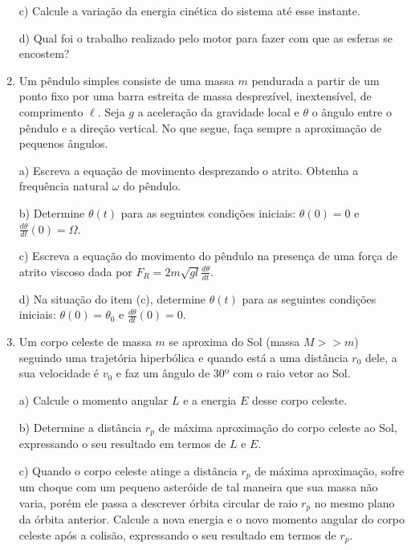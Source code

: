 \begin{enumerate}[start=1,label={\bfseries Q\arabic*.}]
c) Calcule a variação da energia cinética do sistema até esse instante.

\resposta

d) Qual foi o trabalho realizado pelo motor para fazer com que as esferas se encostem?

\resposta


\item Um pêndulo simples consiste de uma massa $m$ pendurada a partir de um ponto fixo por uma barra estreita de massa desprezível, inextensível, de comprimento $\ell$. Seja $g$ a aceleração da gravidade local e $\theta$ o ângulo entre o pêndulo e a direção vertical. No que segue, faça sempre a aproximação de pequenos ângulos.

a) Escreva a equação de movimento desprezando o atrito. Obtenha a frequência natural $\omega$ do pêndulo.

\resposta 



b) Determine $\theta(t)$ para as seguintes condições iniciais: $\theta(0)=0$ e $\frac{d \theta}{d t}(0)=\Omega$.

\resposta

c) Escreva a equação do movimento do pêndulo na presença de uma força de atrito viscoso dada por $F_{R}=2 m \sqrt{g l} \frac{d \theta}{d t}$.

\resposta

d) Na situação do item (c), determine $\theta (t)$ para as seguintes condições iniciais: $\theta(0) = \theta_{0}$ e $\frac{d\theta}{dt} (0) = 0$.

\resposta


\item Um corpo celeste de massa $m$ se aproxima do Sol (massa $M >> m$) seguindo uma trajetória hiperbólica e quando está a uma distância $r_{0}$ dele, a sua velocidade é $v_{0}$ e faz um ângulo de $30º$ com o raio vetor ao Sol.

a) Calcule o momento angular $L$ e a energia $E$ desse corpo celeste.

\resposta

b) Determine a distância $r_{p}$ de máxima aproximação do corpo celeste ao Sol, expressando o seu resultado em termos de $L$ e $E$.

\resposta

c) Quando o corpo celeste atinge a distância $r_{p}$ de máxima aproximação, sofre um choque com um pequeno asteróide de tal maneira que sua massa não varia, porém ele passa a descrever órbita circular de raio $r_{p}$ no mesmo plano da órbita anterior. Calcule a nova energia e o novo momento angular do corpo celeste após a colisão, expressando o seu resultado em termos de $r_{p}$.


\end{enumerate}
